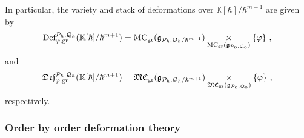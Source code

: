 \documentclass[11pt]{amsart}
\numberwithin{equation}{section}
\theoremstyle{definition}
\newcommand{\bb}{\mathbb}
\newcommand{\mc}{\mathcal}
\newcommand{\mf}{\mathfrak}
\newcommand{\Rees}{{\textup{Rees}}}
\newcommand{\Def}{{\textup{Def}}}
\newcommand{\fDef}{{\mathfrak{Def}}}
\newcommand{\Ph}{{\mathcal{P}_\hbar}}
\newcommand{\Qh}{{\mathcal{Q}_\hbar}}
\newcommand{\gd}{{\textup{gr}}}
\newcommand{\Mod}{{\textup{-Mod}}}
\newcommand{\K}{{\bb K}}
\newcommand{\ik}{{\bb K}}
\newcommand{\triv}{{\textup{triv}}}
\newcommand{\MC}{{{\textup{MC}}}}
\newcommand{\fMC}{{{\mathfrak{MC}}}}
\newcommand{\0}{{\textbf{0}}}
\newcommand{\gr}{\textup{gr}}
\newcommand{\Z}{\bb Z}
\newcommand{\g}{{\mf{g}}}
\def\PP{{\mc P}}
\def \mf{\mathfrak}
\newcommand{\fibre}[1]{\underset{#1}{\times}}
\begin{document}
In particular, the variety and stack of deformations over $\K[\hbar]/\hbar^{m+1}$ are given by
\[
	\Def_{\varphi,\gd}^{\Ph,\Qh}(\K[\hbar]/\hbar^{m+1})  =\MC_\gr(\g_{\Ph,\Qh /\hbar^{m+1}})\fibre{\MC_\gr(\g_{\mc P_0,\mc Q_0})} \{ \varphi \}~,
\]
and
\[
	\fDef_{\varphi,\gd}^{\Ph,\Qh}(\K[\hbar]/\hbar^{m+1})  =\fMC_\gr(\g_{\Ph,\Qh /\hbar^{m+1}})\fibre{\fMC_\gr(\g_{\mc P_0,\mc Q_0})} \{ \varphi \}   ~,
\]
respectively.


%
%

\subsubsection{Order by order deformation theory}
\end{document}
